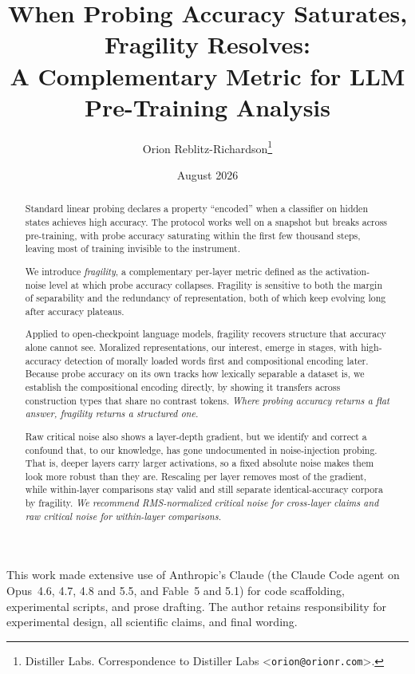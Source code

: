 \documentclass{article}
\title{When Probing Accuracy Saturates, Fragility Resolves:\\
  A Complementary Metric for LLM Pre-Training Analysis}
\author{%
  Orion Reblitz-Richardson\thanks{%
    Distiller Labs. Correspondence to Distiller Labs
    \textless\texttt{orion@orionr.com}\textgreater.}
}
\date{August 2026}
\begin{document}
\maketitle

\begin{abstract}
Standard linear probing declares a property ``encoded'' when a
classifier on hidden states achieves high accuracy. The protocol works
well on a snapshot but breaks across pre-training, with probe accuracy
saturating within the first few thousand steps, leaving most of
training invisible to the instrument.

We introduce \emph{fragility}, a complementary per-layer metric
defined as the activation-noise level at which probe accuracy
collapses. Fragility is sensitive to both the margin of separability
and the redundancy of representation, both of which keep evolving long
after accuracy plateaus.

Applied to open-checkpoint language models, fragility recovers
structure that accuracy alone cannot see. Moralized representations,
our interest, emerge in stages, with high-accuracy detection of morally
loaded words first and compositional encoding later. Because probe
accuracy on its own tracks how lexically separable a dataset is, we
establish the compositional encoding directly, by showing it transfers
across construction types that share no contrast tokens.
\emph{Where probing accuracy returns a flat answer, fragility returns a
structured one.}

Raw critical noise also shows a layer-depth gradient, but we identify
and correct a confound that, to our knowledge, has gone undocumented in
noise-injection probing. That is, deeper layers carry larger
activations, so a fixed absolute noise makes them look more robust than
they are. Rescaling per layer removes most of the gradient, while
within-layer comparisons stay valid and still separate
identical-accuracy corpora by fragility. \emph{We recommend
RMS-normalized critical noise for cross-layer claims and raw critical
noise for within-layer comparisons.}
\end{abstract}








\begin{ack}
This work made extensive use of Anthropic's Claude (the Claude Code agent on
Opus~4.6, 4.7, 4.8 and 5.5, and Fable~5 and 5.1) for code scaffolding, experimental scripts, and
prose drafting. The author retains responsibility for experimental design, all
scientific claims, and final wording.
\end{ack}
\end{document}
